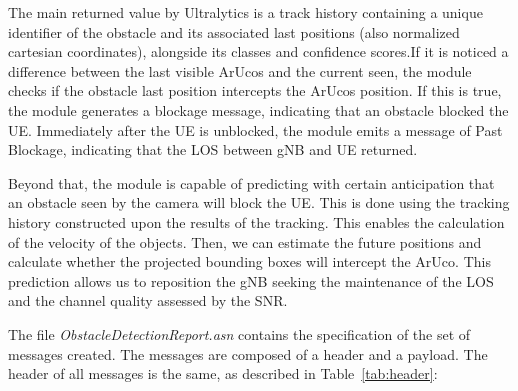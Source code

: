 The main returned value by Ultralytics is a track history containing a unique identifier of the obstacle and its associated last positions (also normalized cartesian coordinates), alongside its classes and confidence scores.If it is noticed a difference between the last visible ArUcos and the current seen, the module checks if the obstacle last position intercepts the ArUcos position.
If this is true, the module generates a blockage message, indicating that an obstacle blocked the UE\@.
Immediately after the UE is unblocked, the module emits a message of Past Blockage, indicating that the LOS between gNB and UE returned.

Beyond that, the module is capable of predicting with certain anticipation that an obstacle seen by the camera will block the UE\@.
This is done using the tracking history constructed upon the results of the tracking.
This enables the calculation of the velocity of the objects.
Then, we can estimate the future positions and calculate whether the projected bounding boxes will intercept the ArUco.
This prediction allows us to reposition the gNB seeking the maintenance of the LOS and the channel quality assessed by the SNR\@.

The file \textit{ObstacleDetectionReport.asn} contains the specification of the set of messages created.
The messages are composed of a header and a payload.
The header of all messages is the same, as described in Table~\ref{tab:header}:


\begin{table}[H]
    \caption{Components of the Message Header}
    \label{tab:header}
    \centering
\end{table}


